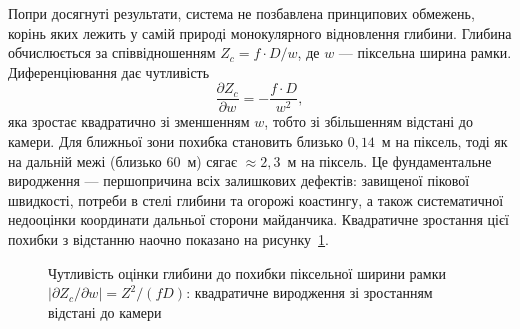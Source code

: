 Попри досягнуті результати, система не позбавлена принципових обмежень, корінь яких
лежить у самій природі монокулярного відновлення глибини. Глибина обчислюється за
співвідношенням $Z_c = f \cdot D / w$, де $w$ --- піксельна ширина рамки. Диференціювання
дає чутливість
\begin{equation}
\frac{\partial Z_c}{\partial w} = -\frac{f \cdot D}{w^2},
\end{equation}
яка зростає квадратично зі зменшенням $w$, тобто зі збільшенням відстані до камери. Для
ближньої зони похибка становить близько $0{,}14$~м на піксель, тоді як на дальній межі
(близько $60$~м) сягає $\approx 2{,}3$~м на піксель. Це фундаментальне виродження ---
першопричина всіх залишкових дефектів: завищеної пікової швидкості, потреби в стелі
глибини та огорожі коастингу, а також систематичної недооцінки координати дальньої
сторони майданчика. Квадратичне зростання цієї похибки з відстанню наочно показано
на рисунку~\ref{fig:depth_sensitivity}.

\begin{figure}[!htbp]
\centering
{}
\caption{Чутливість оцінки глибини до похибки піксельної ширини рамки
$\left|\partial Z_c/\partial w\right|=Z^2/(fD)$: квадратичне виродження зі зростанням
відстані до камери}
\label{fig:depth_sensitivity}
\end{figure}


